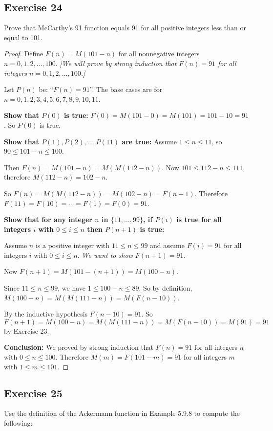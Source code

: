 \documentclass[14pt]{extarticle}
\begin{document}
\subsection{Exercise 24}
Prove that McCarthy’s 91 function equals 91 for all positive integers less than or equal to 101.

\begin{proof}
    Define \(F(n) = M(101 - n)\) for all nonnegative integers \(n = 0, 1, 2, \ldots, 100\).
        {\it [We will prove by strong induction that \(F(n) = 91\) for all integers \(n = 0, 1, 2, \ldots, 100\).]}

    Let $P(n)$ be: ``\(F(n) = 91\)''. The base cases are for \(n = 0, 1, 2, 3, 4, 5, 6, 7, 8, 9, 10, 11\).

        {\bf Show that $P(0)$ is true:} \(F(0) = M(101 - 0) = M(101) = 101 - 10 = 91\). So $P(0)$ is true.

        {\bf Show that \(P(1), P(2), \ldots, P(11)\) are true:} Assume \(1 \leq n \leq 11\), so \(90 \leq 101-n \leq 100\).

    Then \(F(n) = M(101 - n) = M(M(112 - n))\). Now \(101 \leq 112-n \leq 111\), therefore \(M(112 - n) = 102 - n\).

    So \(F(n) = M(M(112 - n)) = M(102 - n) = F(n-1)\).
    Therefore \(F(11) = F(10) = \cdots = F(1) = F(0) = 91\).

        {\bf Show that for any integer $n$ in \(\{11, \ldots, 99\}\), if $P(i)$ is true for all integers $i$ with
            \(0 \leq i \leq n\) then $P(n+1)$ is true:}

    Assume $n$ is a positive integer with \(11 \leq n \leq 99\) and assume \(F(i) = 91\) for all integers $i$ with
    \(0 \leq i \leq n\). {\it We want to show \(F(n+1) = 91\).}

    Now \(F(n+1) = M(101 - (n+1)) = M(100 - n)\).

    Since \(11 \leq n \leq 99\), we have \(1 \leq 100-n \leq 89\). So by definition, \(M(100 - n) = M(M(111 - n)) = M(F(n-10))\).

    By the inductive hypothesis \(F(n-10) = 91\). So \(F(n+1) = M(100 - n) = M(M(111 - n)) = M(F(n-10)) = M(91) = 91\) by Exercise 23.

        {\bf Conclusion:} We proved by strong induction that \(F(n) = 91\) for all integers $n$ with \(0 \leq n \leq 100\).
    Therefore \(M(m) = F(101 - m) = 91\) for all integers $m$ with \(1 \leq m \leq 101\).
\end{proof}

\subsection{Exercise 25}
Use the definition of the Ackermann function in Example 5.9.8 to compute the following:
\end{document}
